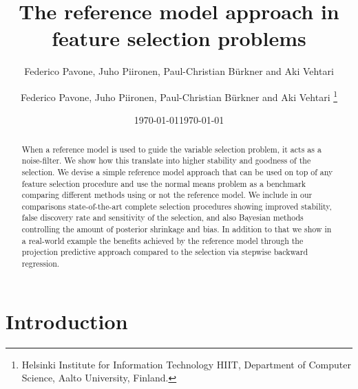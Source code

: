\documentclass[american,]{article}
\title{The reference model approach in feature selection problems 
	\vspace{.1in}}
\author{Federico Pavone, Juho Piironen, Paul-Christian B\"{u}rkner and Aki Vehtari}
\author{
    Federico Pavone, 
  Juho Piironen,
  Paul-Christian B\"{u}rkner
  and Aki Vehtari \footnote{Helsinki Institute for Information Technology HIIT,
  Department of Computer Science, Aalto University, Finland.}
  }
\date{\today}
\date{\today}
\theoremstyle{definition}
\begin{document}
\maketitle
\begin{abstract}
When a reference model is used to guide the variable selection problem, it acts as a noise-filter. We show how this translate into higher stability and goodness of the selection. We devise a simple reference model approach that can be used on top of any feature selection procedure and use the normal means problem as a benchmark comparing different methods using or not the reference model. We include in our comparisons state-of-the-art complete selection procedures showing improved stability, false discovery rate and sensitivity of the selection, and also Bayesian methods controlling the amount of posterior shrinkage and bias. In addition to that we show in a real-world example the benefits achieved by the reference model through the projection predictive approach compared to the selection via stepwise backward regression.
\end{abstract}

\hypertarget{introduction}{%
\section{Introduction}\label{introduction}}

\end{document}
